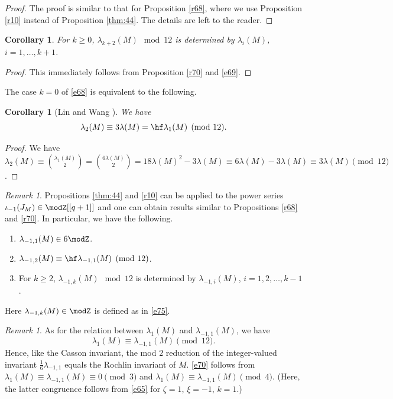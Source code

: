 \documentclass{amsart}
\numberwithin{equation}{section}
\numberwithin{figure}{section}
\theoremstyle{plain}
\newtheorem{corollary}[theorem]{Corollary}
\theoremstyle{definition}
\theoremstyle{remark}
\newtheorem{remark}[theorem]{Remark}
\begin{document}
\begin{proof}
  The proof is similar to that for Proposition \ref{r68}, where we use
  Proposition \ref{r10} instead of Proposition \ref{thm:44}.  The
  details are left to the reader.
\end{proof}

\begin{corollary}
  \label{r59}
  For $k\ge 0$, $\lambda _{k+2}(M)\mod{12}$ is determined by $\lambda _i(M)$,
  $i=1,\ldots,k+1$.
\end{corollary}

\begin{proof}
  This immediately follows from Proposition \ref{r70} and \eqref{e69}.
\end{proof}

The case $k=0$ of \eqref{e68} is equivalent to the following.

\begin{corollary}[Lin and Wang \cite{Lin-Wang2}]
  \label{r60}
  We have
  \begin{equation*}
    \lambda _2(M)\equiv3\lambda (M)=\hf\lambda _1(M)\pmod{12}.
  \end{equation*}
\end{corollary}

\begin{proof}
  We have
  $\lambda _2(M)\equiv\binom{\lambda _1(M)}{2} =\binom{6\lambda (M)}{2}
  =18\lambda (M)^2-3\lambda (M) \equiv6\lambda (M)-3\lambda (M) \equiv3\lambda (M)\pmod{12}$.
\end{proof}

\begin{remark}
  \label{r61}
  Propositions \ref{thm:44} and \ref{r10} can be applied to the power
  series $\iota _{-1}(J_M)\in \modZ [[q+1]]$ and one can obtain results similar
  to Propositions \ref{r68} and \ref{r70}.  In particular, we have the
  following.
  \begin{enumerate}
  \item $\lambda _{-1,1}(M)\in 6\modZ $.
  \item $\lambda _{-1,2}(M)\equiv\hf\lambda _{-1,1}(M)\pmod{12}$.
  \item For $k\ge 2$, $\lambda _{-1,k}(M)\mod12$ is determined by
  $\lambda _{-1,i}(M)$, $i=1,2,\ldots,k-1$.
  \end{enumerate}
  Here $\lambda _{-1,k}(M)\in \modZ $ is defined as in \eqref{e75}.
\end{remark}

\begin{remark}
  \label{r63}
  As for the relation between $\lambda _1(M)$ and $\lambda _{-1,1}(M)$, we have
  \begin{equation}
    \label{e70}
    \lambda _1(M)\equiv\lambda _{-1,1}(M)\pmod{12}.
  \end{equation}
  Hence, like the Casson invariant, the mod $2$ reduction of the
  integer-valued invariant $\frac16\lambda _{-1,1}$ equals the Rochlin
  invariant of $M$.  \eqref{e70} follows from
  $\lambda _1(M)\equiv\lambda _{-1,1}(M)\equiv0\pmod3$ and
  $\lambda _1(M)\equiv\lambda _{-1,1}(M)\pmod{4}$.  (Here, the latter congruence
  follows from \eqref{e65} for $\zeta =1$, $\xi =-1$, $k=1$.)
\end{remark}
\end{document}
